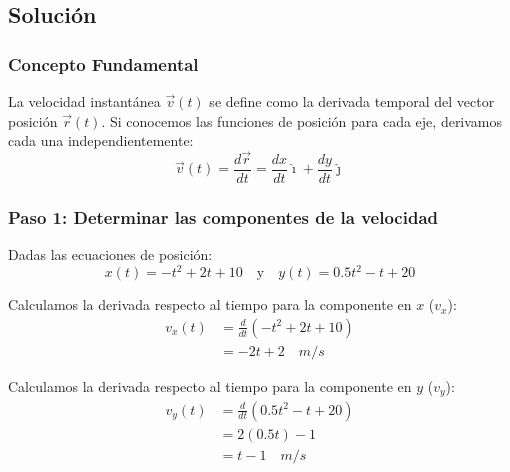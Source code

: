 \documentclass[12pt, a4paper]{article}
\begin{document}
\begin{center}
\end{center}

\subsection*{Solución}

\subsubsection*{Concepto Fundamental}
La velocidad instantánea $\vec{v}(t)$ se define como la derivada temporal del vector posición $\vec{r}(t)$. Si conocemos las funciones de posición para cada eje, derivamos cada una independientemente:
\begin{equation}
    \vec{v}(t) = \frac{d\vec{r}}{dt} = \frac{dx}{dt}\hat{\imath} + \frac{dy}{dt}\hat{\jmath}
\end{equation}

\subsubsection*{Paso 1: Determinar las componentes de la velocidad}
Dadas las ecuaciones de posición:
$$ x(t) = -t^2 + 2t + 10 \quad \text{y} \quad y(t) = 0.5t^2 - t + 20 $$

Calculamos la derivada respecto al tiempo para la componente en $x$ ($v_x$):
\begin{align*}
    v_x(t) &= \frac{d}{dt}(-t^2 + 2t + 10) \\
    &= -2t + 2 \quad \si{m/s}
\end{align*}

Calculamos la derivada respecto al tiempo para la componente en $y$ ($v_y$):
\begin{align*}
    v_y(t) &= \frac{d}{dt}(0.5t^2 - t + 20) \\
    &= 2(0.5t) - 1 \\
    &= t - 1 \quad \si{m/s}
\end{align*}
\end{document}
